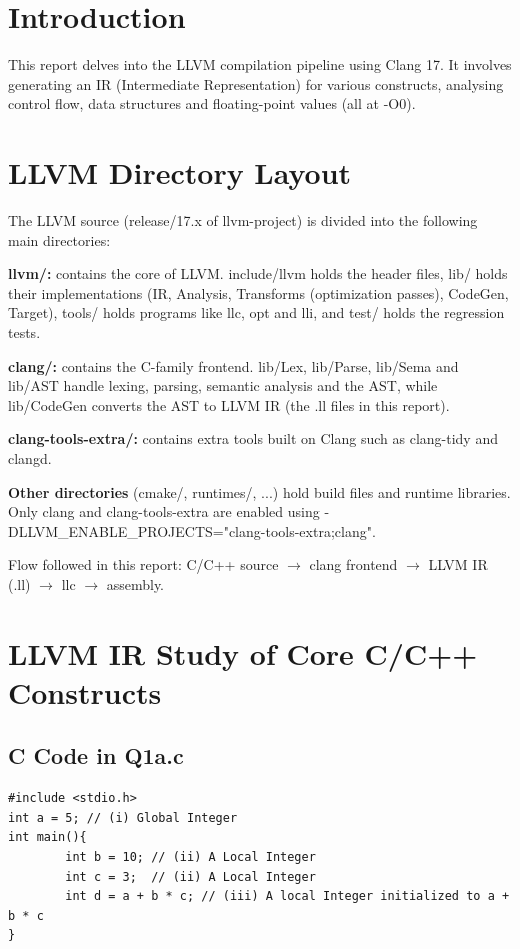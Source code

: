 \section*{Introduction}

This report delves into the LLVM compilation pipeline using Clang 17. It involves generating an IR (Intermediate Representation) for various constructs, analysing control flow, data structures and floating-point values (all at -O0).


\section{LLVM Directory Layout}

The LLVM source (release/17.x of llvm-project) is divided into the following main directories:


\textbf{llvm/: }contains the core of LLVM. include/llvm holds the header files, lib/ holds their implementations (IR, Analysis, Transforms (optimization passes), CodeGen, Target), tools/ holds programs like llc, opt and lli, and test/ holds the regression tests.


\textbf{clang/: }contains the C-family frontend. lib/Lex, lib/Parse, lib/Sema and lib/AST handle lexing, parsing, semantic analysis and the AST, while lib/CodeGen converts the AST to LLVM IR (the .ll files in this report).


\textbf{clang-tools-extra/: }contains extra tools built on Clang such as clang-tidy and clangd.


\textbf{Other directories }(cmake/, runtimes/, ...) hold build files and runtime libraries. Only clang and clang-tools-extra are enabled using -DLLVM\_ENABLE\_PROJECTS="clang-tools-extra;clang".


Flow followed in this report: C/C++ source $\rightarrow$ clang frontend $\rightarrow$ LLVM IR (.ll) $\rightarrow$ llc $\rightarrow$ assembly.


\section{LLVM IR Study of Core C/C++ Constructs}

\subsection{C Code in Q1a.c}

\begin{lstlisting}
#include <stdio.h>
int a = 5; // (i) Global Integer
int main(){
        int b = 10; // (ii) A Local Integer
        int c = 3;  // (ii) A Local Integer
        int d = a + b * c; // (iii) A local Integer initialized to a + b * c
}
\end{lstlisting}

